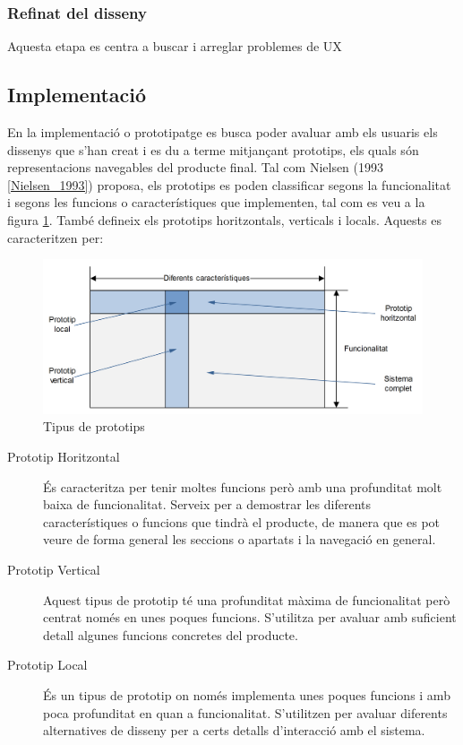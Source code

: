 \subsubsection{Refinat del disseny}
Aquesta etapa es centra a buscar i arreglar problemes de \ac{UX} 


\subsection{Implementació}
En la implementació o prototipatge es busca poder avaluar amb els usuaris els dissenys que s'han creat i es du a terme mitjançant prototips, els quals són representacions navegables del producte final. Tal com Nielsen (1993 \ref{Nielsen_1993}) proposa, els prototips es poden classificar segons la funcionalitat i segons les funcions o característiques que implementen, tal com es veu a la figura \ref{fig:types_prototypes}. També defineix els prototips horitzontals, verticals i locals. Aquests es caracteritzen per:

\begin{figure}[ht]
\centering
\includegraphics[scale=0.8]{Types_prototypes.png}
\caption{Tipus de prototips}\label{fig:types_prototypes}
\end{figure}

\begin{description}
\item[Prototip Horitzontal] És caracteritza per tenir moltes funcions però amb una profunditat molt baixa de funcionalitat. Serveix per a demostrar les diferents característiques o funcions que tindrà el producte, de manera que es pot veure de forma general les seccions o apartats i la navegació en general.
\item[Prototip Vertical] Aquest tipus de prototip té una profunditat màxima de funcionalitat però centrat només en unes poques funcions. S'utilitza per avaluar amb suficient detall algunes funcions concretes del producte. 
\item[Prototip Local] És un tipus de prototip on només implementa unes poques funcions i amb poca profunditat en quan a funcionalitat. S'utilitzen per avaluar diferents alternatives de disseny per a certs detalls d'interacció amb el sistema. 
\end{description}

